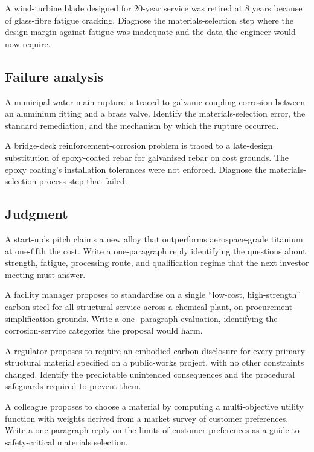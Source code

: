 \begin{exercise}
A wind-turbine blade designed for $20$-year service was retired at
$8$ years because of glass-fibre fatigue cracking. Diagnose the
materials-selection step where the design margin against fatigue was
inadequate and the data the engineer would now require.
\end{exercise}

\subsection*{Failure analysis}

\begin{exercise}
A municipal water-main rupture is traced to galvanic-coupling
corrosion between an aluminium fitting and a brass valve. Identify
the materials-selection error, the standard remediation, and the
mechanism by which the rupture occurred.
\end{exercise}

\begin{exercise}
A bridge-deck reinforcement-corrosion problem is traced to a
late-design substitution of epoxy-coated rebar for galvanised rebar
on cost grounds. The epoxy coating's installation tolerances were
not enforced. Diagnose the materials-selection-process step that
failed.
\end{exercise}

\subsection*{Judgment}

\begin{exercise}
A start-up's pitch claims a new alloy that outperforms aerospace-grade
titanium at one-fifth the cost. Write a one-paragraph reply identifying
the questions about strength, fatigue, processing route, and
qualification regime that the next investor meeting must answer.
\end{exercise}

\begin{exercise}
A facility manager proposes to standardise on a single ``low-cost,
high-strength'' carbon steel for all structural service across a
chemical plant, on procurement-simplification grounds. Write a one-
paragraph evaluation, identifying the corrosion-service categories
the proposal would harm.
\end{exercise}

\begin{exercise}
A regulator proposes to require an embodied-carbon disclosure for
every primary structural material specified on a public-works
project, with no other constraints changed. Identify the predictable
unintended consequences and the procedural safeguards required to
prevent them.
\end{exercise}

\begin{exercise}
A colleague proposes to choose a material by computing a
multi-objective utility function with weights derived from a market
survey of customer preferences. Write a one-paragraph reply on the
limits of customer preferences as a guide to safety-critical
materials selection.
\end{exercise}

